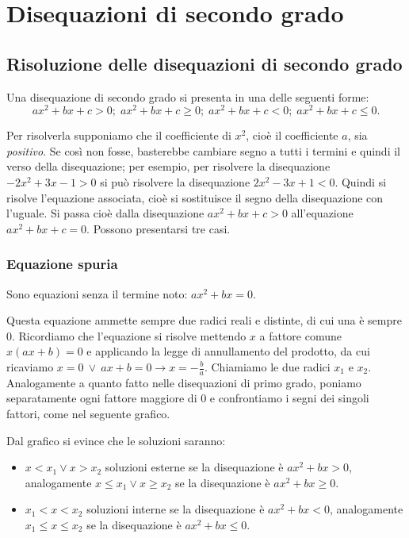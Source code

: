 \chapter{Disequazioni di secondo grado}
\section{Risoluzione delle disequazioni di secondo grado}
Una disequazione di secondo grado si presenta in una delle seguenti forme:
\[ax^2+bx+c>0;\; ax^2+bx+c\ge 0;\; ax^2+bx+c<0;\; ax^2+bx+c\le 0. \]

Per risolverla supponiamo che il coefficiente di $x^2$, cioè il coefficiente $a$, sia \textit{positivo}. Se così non fosse, basterebbe cambiare segno a tutti i termini e quindi il verso della disequazione; per esempio, per risolvere la disequazione $-2x^2+3x-1>0$ si può risolvere la disequazione $2x^2-3x+1<0$.
Quindi si risolve l'equazione associata, cioè si sostituisce il segno della disequazione con l'uguale. Si passa cioè dalla disequazione $ax^2+bx+c>0$ all'equazione $ax^2+bx+c=0$. Possono presentarsi tre casi.

\subsection{Equazione spuria}
Sono equazioni senza il termine noto: $ax^2+bx=0$.

Questa equazione ammette sempre due radici reali e distinte, di cui una è sempre $0$. Ricordiamo che l'equazione si risolve mettendo $x$ a fattore comune $x(ax+b)=0$ e applicando la legge di annullamento del prodotto, da cui ricaviamo $x=0\ \vee \ ax+b=0\rightarrow x=-\frac b a$. Chiamiamo le due radici $x_1$ e $x_2$. Analogamente a quanto fatto nelle disequazioni di primo grado, poniamo separatamente ogni fattore maggiore di $0$ e confrontiamo i segni dei singoli fattori, come nel seguente grafico.
\begin{center}

\end{center}
Dal grafico si evince che le soluzioni saranno:
\begin{itemize}
\item $x<x_1\vee x>x_2$ soluzioni esterne se la disequazione è $ax^2+bx>0$, analogamente $x\le x_1\vee x\ge x_2$ se la disequazione è $ax^2+bx\ge 0$.
\item $x_1<x<x_2$ soluzioni interne se la disequazione è $ax^2+bx<0$, analogamente $x_1\le x\le x_2$ se la disequazione è $ax^2+bx\le 0$.
\end{itemize}

